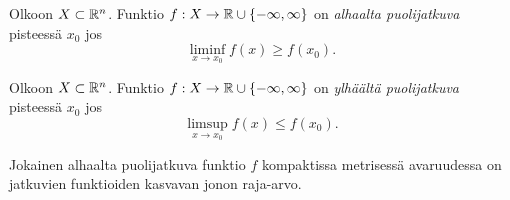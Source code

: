 \documentclass[12pt,oneside,a4paper]{amsbook} %
\begin{document}
\begin{definition}
    Olkoon $X\subset \mathbb{R}^n$. Funktio $f: X \to \mathbb{R} \cup\{-\infty, \infty\}$ on \textit{alhaalta puolijatkuva} pisteessä $x_0$ jos 
    $$\liminf_{x\to x_0}  f(x) \ge f(x_0).$$
\end{definition}

\begin{definition}
    Olkoon $X\subset \mathbb{R}^n$. Funktio $f: X \to \mathbb{R} \cup\{-\infty, \infty\}$ on \textit{ylhäältä puolijatkuva} pisteessä $x_0$ jos 
    $$\limsup_{x\to x_0}  f(x) \le f(x_0).$$
\end{definition}

\begin{lemma}\label{le:LSCisLimitOfC-Functions}
    Jokainen alhaalta puolijatkuva funktio $f$ kompaktissa metrisessä avaruudessa on jatkuvien funktioiden kasvavan jonon raja-arvo.
\end{lemma}
\end{document}
